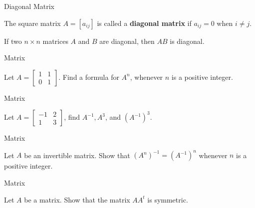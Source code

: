 \documentclass{beamer}
\begin{document}
\begin{frame}[t]{Diagonal Matrix}
    \begin{definition}
        The square matrix $A = [a_{ij}]$ is called a \textbf{diagonal matrix} if $a_{ij} = 0$ when $i \neq j$.
    \end{definition}
    \begin{theorem}
        If two $n \times n$ matrices $A$ and $B$ are diagonal, then $AB$ is diagonal. 
    \end{theorem}
\end{frame}

\begin{frame}[t]{Matrix}
    \begin{example}
        Let $A = \begin{bmatrix} 1 & 1 \\ 0 & 1 \end{bmatrix}$. Find a formula for $A^n$, whenever $n$ is a positive integer.
    \end{example}
\end{frame}

\begin{frame}[t]{Matrix}
    \begin{example}
        Let $A = \begin{bmatrix}
            -1 & 2 \\
            1 & 3
        \end{bmatrix}$, find $A^{-1}, A^3$, and $(A^{-1})^3$. 
    \end{example}
\end{frame}

\begin{frame}[t]{Matrix}
    \begin{example}
        Let $A$ be an invertible matrix. Show that $(A^n)^{-1} = (A^{-1})^n$ whenever $n$ is a positive integer. 
    \end{example}
\end{frame}

\begin{frame}[t]{Matrix}
    \begin{example}
        Let $A$ be a matrix. Show that the matrix $AA^t$ is symmetric. 
    \end{example}
\end{frame}
\end{document}
